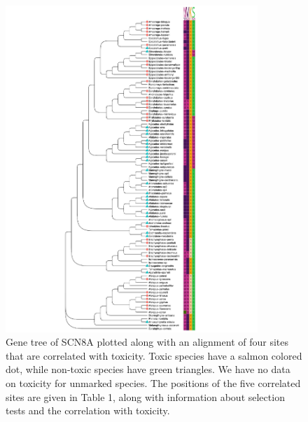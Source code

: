 \documentclass{article}
\begin{document}
\begin{figure}[h!]
    \centering
    \includegraphics[width=0.85\textwidth]{figures/SCN8A.corrTree.trimmed.pdf}
    \caption{Gene tree of SCN8A plotted along with an alignment of four sites that are correlated with toxicity. Toxic species have a salmon colored dot, while non-toxic species have green triangles. We have no data on toxicity for unmarked species. The positions of the five correlated sites are given in Table 1, along with information about selection tests and the correlation with toxicity.}
    \label{fig:my_label}
\end{figure}
\clearpage
\end{document}
